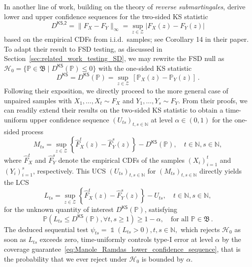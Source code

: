 \documentclass[12pt,twoside]{article}
\theoremstyle{plain}
\theoremstyle{definition}
\theoremstyle{remark}
\newcommand{\inparen}[1]{\left(#1\right)}
\DeclareMathOperator*{\indsymb}{\mathds{1}}
\newcommand{\indicator}[1]{\indsymb\inparen{#1}}
\newcommand{\N}{\mathbb{N}}
\newcommand{\calH}{\mathcal{H}}
\newcommand{\calZ}{\mathcal{Z}}
\newcommand{\Psymb}{\mathbb{P}}
\newcommand{\frakB}{\mathfrak{B}}
\begin{document}
In another line of work, building on the theory of \emph{reverse submartingales}, \citet{manole2023martingale} derive lower and upper confidence sequences for the two-sided KS statistic
\begin{equation*}
    D^\textsf{KS,2} = \lVert F_X - F_Y \rVert_{\infty} = \sup_{z \in \calZ} |F_X(z) - F_Y(z) |
\end{equation*}
based on the empirical CDFs from i.i.d.~samples; see Corollary 14 in their paper. 
To adapt their result to FSD testing, as discussed in Section~\ref{sec:related_work_testing_SD}, we may rewrite the FSD null as $ \calH_0 =\{\Psymb \in \frakB \mid  D^\mathsf{KS}(\Psymb) \leq 0\}$ with the one-sided KS statistic
\begin{equation*}
    D^\mathsf{KS} = D^\mathsf{KS}(\Psymb) = 
    \sup_{z \in \calZ}\, [\Psymb_X(z) - \Psymb_Y(z)]\,.
\end{equation*}
Following their exposition, we directly proceed to the more general case of unpaired samples with $X_1, \dotsc, X_t \sim F_X$ and $Y_1, \dotsc, Y_s \sim F_Y$.
From their proofs, we can readily extend their results on the two-sided KS statistic to obtain a time-uniform upper confidence sequence $(U_{ts})_{t,s\in \N}$ at level $\alpha\in (0,1)$ for the one-sided process 
\begin{equation*}
    M_{ts} = \sup_{z \in \calZ} \left\{\hat{F}_{X}^t(z)-\hat{F}_{Y}^s(z)\right\}- D^\mathsf{KS}(\Psymb), \quad t\in \N, s\in \N,
\end{equation*}
where $\hat{F}_{X}^t$ and $\hat{F}_{Y}^s$ denote the empirical CDFs of the samples $(X_i)_{i=1}^t$ and $(Y_i)_{i=1}^s$, respectively. This UCS $(U_{ts})_{t,s\in \N}$ for $(M_{ts})_{t,s\in \N}$ directly yields the LCS $$
L_{ts}=\sup_{z \in \calZ} \left\{\hat{F}_{X}^t(z)-\hat{F}_{Y}^s(z)\right\}-U_{ts}, \quad t\in \N,s\in \N,$$ 
for the unknown quantity of interest $D^\mathsf{KS}(\Psymb)$, satisfying
\begin{equation}\label{eq:Manole_Ramdas_lower_confidence_sequence}
    \Psymb(L_{ts} \leq D^\mathsf{KS}(\Psymb), \forall t, s \geq 1) \geq 1-\alpha, \quad \textrm{for all }\Psymb \in \frakB\,.
\end{equation}
The deduced sequential test $\psi_{ts} = \indicator{L_{ts} > 0}, t,s\in \N,$ which rejects $\calH_0$ as soon as $L_{ts}$ exceeds zero, time-uniformly controls type-I error at level $\alpha$ by the coverage guarantee~\eqref{eq:Manole_Ramdas_lower_confidence_sequence}, that is the probability that we ever reject under $\calH_0$ is bounded by $\alpha$. 
\end{document}
